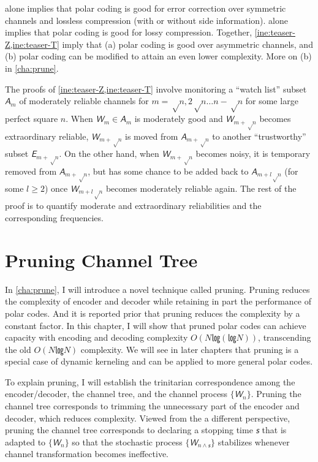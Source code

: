 \documentclass[openany]{amsbook}
\numberwithin{equation}{chapter}
\numberwithin{figure}{chapter}
\numberwithin{table}{chapter}
\theoremstyle{definition}	理dfn:Definition~?s			理exa:Example~?s
\theoremstyle{remark}		理cla:Claim~?s				理rem:Remark~?s
\begin{document}
	 alone implies that polar coding is good for error correction
	over symmetric channels and lossless compression (with or without side information).
	 alone implies that polar coding is good for lossy compression.
	Together, \cref{ine:teaser-Z,ine:teaser-T} imply that
	(a)	polar coding is good over asymmetric channels, and
	(b)	polar coding can be modified to attain an even lower complexity.
	More on (b) in \cref{cha:prune}.
	
	The proofs of \cref{ine:teaser-Z,ine:teaser-T} involve monitoring
	a “watch list” subset $𝘈_m$ of moderately reliable channels
	for $m=√n,2√n…n-√n$ for some large perfect square $n$.
	When $𝘞_m∈𝘈_m$ is moderately good and $𝘞_{m+√n}$ becomes extraordinary reliable,
	$𝘞_{m+√n}$ is moved from $𝘈_{m+√n}$ to another “trustworthy” subset $𝘌_{m+√n}$.
	On the other hand, when $𝘞_{m+√n}$ becomes noisy, it is temporary removed
	from $𝘈_{m+√n}$, but has some chance to be added back to $𝘈_{m+l√n}$
	(for some $l≥2$) once $𝘞_{m+l√n}$ becomes moderately reliable again.
	The rest of the proof is to quantify moderate and extraordinary
	reliabilities and the corresponding frequencies.

\section{Pruning Channel Tree}

	In \cref{cha:prune}, I will introduce a novel technique called pruning.
	Pruning reduces the complexity of encoder and decoder
	while retaining in part the performance of polar codes.
	And it is reported prior that pruning reduces the complexity by a constant factor.
	In this chapter, I will show that pruned polar codes can
	achieve capacity with encoding and decoding complexity $O(N㏒(㏒N))$,
	transcending the old $O(N㏒N)$ complexity.
	We will see in later chapters that pruning is a special case of
	dynamic kerneling and can be applied to more general polar codes.
	
	To explain pruning, I will establish the trinitarian correspondence among
	the encoder/decoder, the channel tree, and the channel process $\{𝘞_n\}$.
	Pruning the channel tree corresponds to trimming the unnecessary part
	of the encoder and decoder, which reduces complexity.
	Viewed from the a different perspective, pruning the channel tree
	corresponds to declaring a stopping time $𝘴$ that is adapted to
	$\{𝘞_n\}$ so that the stochastic process $\{𝘞_{n∧𝘴}\}$ stabilizes
	whenever channel transformation becomes ineffective.
	
\end{document}
